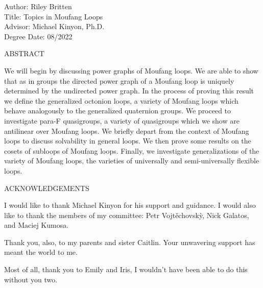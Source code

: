 \documentclass[12pt]{report}
\theoremstyle{definition}
\begin{document}
\addtocounter{page}{1}

\newpage %


\noindent
\vspace{-3mm}Author: Riley Britten\\
\vspace{-3mm}Title: Topics in Moufang Loops\\
\vspace{-3mm}Advisor: Michael Kinyon, Ph.D.\\
Degree Date: 08/2022\\

\centerline{ABSTRACT}
We will begin by discussing power graphs of Moufang loops. We are able to show that as in groups the directed
  power graph of a Moufang loop is uniquely determined by the undirected power graph. In the process of proving
  this result we define the generalized octonion loops, a variety of Moufang loops which behave analogously to
  the generalized quaternion groups. We proceed to investigate para-F quasigroups, a variety of quasigroups
  which we show are antilinear over Moufang loops. We briefly depart from the context of Moufang loops to discuss
  solvability in general loops. We then prove some results on the cosets of subloops of Moufang loops. Finally,
  we investigate generalizations of the variety of Moufang loops, the varieties of universally and
  semi-universally flexible loops.
\newpage

\centerline{ACKNOWLEDGEMENTS}

I would like to thank Michael Kinyon for his support and guidance. I would also like to thank the members of my
  committee: Petr Vojt\v{e}chovsk\`{y}, Nick Galatos, and Maciej Kumosa.

Thank you, also, to my parents and sister Caitlin. Your unwavering support has meant the world to me.

Most of all, thank you to Emily and Iris, I wouldn't have been able to do this without you two.

\newpage

\tableofcontents

\listoftables

\listoffigures
%
\end{document}
